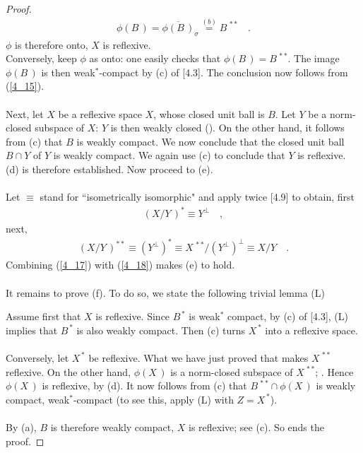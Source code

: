 \begin{proof}
\begin{align}
\phi(B\,)= \overline{\phi(B\,)}_\sigma\overset{(b)}{=} B^{\,\ast\ast}\quad .
\end{align}
$\phi$ is therefore onto, \ie $X$ is reflexive.\\
Conversely, keep $\phi$ as onto: one easily checks that $\phi(B\,)=B^{\,\ast\ast}$. The image $\phi (B\,)$ is then weak$^\ast$-compact by (c) of [4.3]. The conclusion now follows from (\ref{4_15}).\\
\\
Next, let $X$ be a reflexive space $X$, whose closed unit ball is $B$. Let $Y$ be a norm-closed subspace of $X$: $Y$ is then weakly closed (\cf [3.12]). On the other hand, it follows from (c) that $B$ is weakly compact. We now conclude that the closed unit ball $B\cap Y$ of $Y$ is weakly compact. We again use (c) to conclude that $Y$ is reflexive. (d) is therefore established. Now proceed to (e).\\
\\
Let $\equiv$ stand for ``isometrically isomorphic" and apply twice [4.9] to obtain, first
\begin{align}\label{4_17}
(X/Y\,)^\ast \equiv  Y^\bot  \quad ,
\end{align}
next,
\begin{align}\label{4_18}
(X/Y\,)^{\ast\ast}  \equiv  (Y^\bot)^\ast  
 \equiv  X^{\,\ast\ast} / (Y^\bot)^\bot  
 \equiv X/Y\quad .
\end{align}
Combining (\ref{4_17}) with (\ref{4_18}) makes (e) to hold.\\
\\
It remains to prove (f). To do so, we state the following trivial lemma (L)
\begin{quotation}
\end{quotation}
Assume first that $X$ is reflexive. Since $B^{\,\ast}$ is weak$^\ast$ compact, by (c) of [4.3], (L) implies that $B^{\,\ast}$ is also weakly compact. Then (c) turns $X^{\,\ast}$ into a reflexive space. \\
\\
Conversely, let $X^{\,\ast}$ be reflexive. What we have just proved that makes $X^{\,\ast\ast}$ reflexive. On the other hand, $\phi(X\,)$ is a norm-closed subspace of $X^{\,\ast\ast}$; \cf [4.5]. Hence $\phi(X\,)$ is reflexive, by (d). It now follows from (c) that $B^{\,\ast\ast} \cap \phi(X\,)$ is weakly compact, \ie weak$^\ast$-compact (to see this, apply (L) with $Z=X^{\,\ast}$). \\
\\
By (a), $B$ is therefore weakly compact, \ie $X$ is reflexive; see (c). So ends the proof.
\end{proof}



 












